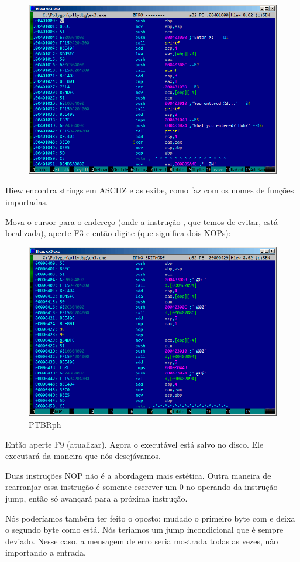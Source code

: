 \begin{figure}[H]
\centering
\includegraphics[scale=\FigScale]{patterns/04_scanf/3_checking_retval/hiew_1.png}
\caption{\PTBRph{}}
\label{fig:scanf_ex3_hiew_1}
\end{figure}

Hiew encontra strings em \ac{ASCIIZ} e as exibe, como faz com os nomes de funções importadas.

\clearpage
Mova o cursor para o endereço  (onde a instrução , que temos de evitar, está localizada), aperte F3 e então digite  (que significa dois \ac{NOP}s):

\begin{figure}[H]
\centering
\includegraphics[scale=\FigScale]{patterns/04_scanf/3_checking_retval/hiew_2.png}
\caption{PTBRph{}}
\label{fig:scanf_ex3_hiew_2}
\end{figure}

Então aperte F9 (atualizar). Agora o executável está salvo no disco. Ele executará da maneira que nós desejávamos.

Duas instruções \ac{NOP} não é a abordagem mais estética.
Outra maneira de rearranjar essa instrução é somente escrever um 0 no operando da instrução jump,
então  só avançará para a próxima instrução.

Nós poderíamos também ter feito o oposto: mudado o primeiro byte com  e deixa o segundo byte como está.
Nós teriamos um jump incondicional que é sempre deviado.
Nesse caso, a mensagem de erro seria mostrada todas as vezes, não importando a entrada.

